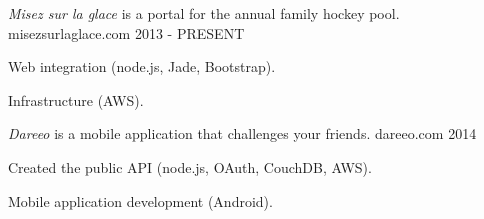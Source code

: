 
\begin{cventries}

  \cventry
    {\textit{Misez sur la glace} is a portal for the annual family hockey pool.} %
    {misezsurlaglace.com} %
    {} %
    {2013 - PRESENT} %
    {
      \begin{cvitems} %
        \item {Web integration (node.js, Jade, Bootstrap).}
        \item {Infrastructure (AWS).}
      \end{cvitems}
    }

  \cventry
    {\textit{Dareeo} is a mobile application that challenges your friends.} %
    {dareeo.com} %
    {} %
    {2014} %
    {
      \begin{cvitems} %
        \item {Created the public API (node.js, OAuth, CouchDB, AWS).}
        \item {Mobile application development (Android).}
      \end{cvitems}
    }


\end{cventries}